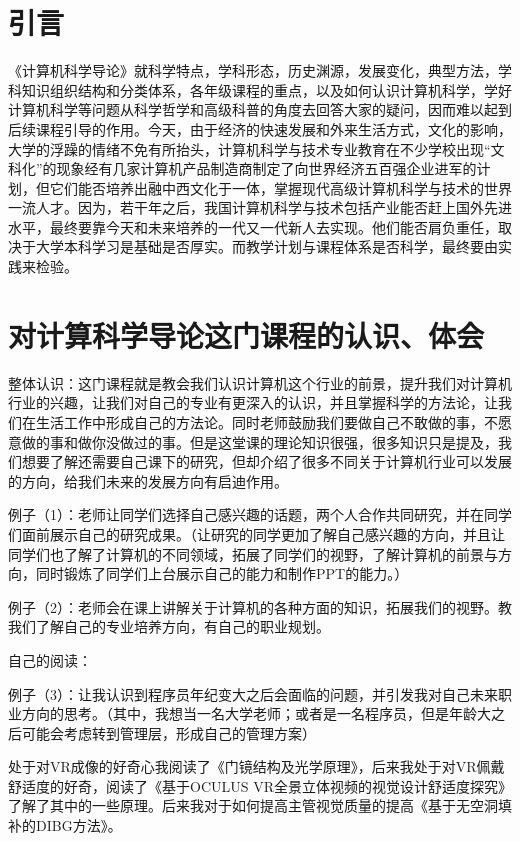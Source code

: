 \documentclass{article}
\begin{document}
\section{引言}
《计算机科学导论》就科学特点，学科形态，历史渊源，发展变化，典型方法，学科知识组织结构和分类体系，各年级课程的重点，以及如何认识计算机科学，学好计算机科学等问题从科学哲学和高级科普的角度去回答大家的疑问，因而难以起到后续课程引导的作用。今天，由于经济的快速发展和外来生活方式，文化的影响，大学的浮躁的情绪不免有所抬头，计算机科学与技术专业教育在不少学校出现“文科化”的现象经有几家计算机产品制造商制定了向世界经济五百强企业进军的计划，但它们能否培养出融中西文化于一体，掌握现代高级计算机科学与技术的世界一流人才。因为，若干年之后，我国计算机科学与技术包括产业能否赶上国外先进水平，最终要靠今天和未来培养的一代又一代新人去实现。他们能否肩负重任，取决于大学本科学习是基础是否厚实。而教学计划与课程体系是否科学，最终要由实践来检验。\par

\section{对计算科学导论这门课程的认识、体会}
 整体认识：这门课程就是教会我们认识计算机这个行业的前景，提升我们对计算机行业的兴趣，让我们对自己的专业有更深入的认识，并且掌握科学的方法论，让我们在生活工作中形成自己的方法论。同时老师鼓励我们要做自己不敢做的事，不愿意做的事和做你没做过的事。但是这堂课的理论知识很强，很多知识只是提及，我们想要了解还需要自己课下的研究，但却介绍了很多不同关于计算机行业可以发展的方向，给我们未来的发展方向有启迪作用。\par
例子（1）：老师让同学们选择自己感兴趣的话题，两个人合作共同研究，并在同学们面前展示自己的研究成果。（让研究的同学更加了解自己感兴趣的方向，并且让同学们也了解了计算机的不同领域，拓展了同学们的视野，了解计算机的前景与方向，同时锻炼了同学们上台展示自己的能力和制作PPT的能力。）\par
例子（2）：老师会在课上讲解关于计算机的各种方面的知识，拓展我们的视野。教我们了解自己的专业培养方向，有自己的职业规划。\par
自己的阅读：\par
例子（3）：让我认识到程序员年纪变大之后会面临的问题，并引发我对自己未来职业方向的思考。（其中，我想当一名大学老师；或者是一名程序员，但是年龄大之后可能会考虑转到管理层，形成自己的管理方案）\par
处于对VR成像的好奇心我阅读了《门镜结构及光学原理》，后来我处于对VR佩戴舒适度的好奇，阅读了《基于OCULUS VR全景立体视频的视觉设计舒适度探究》了解了其中的一些原理。后来我对于如何提高主管视觉质量的提高《基于无空洞填补的DIBG方法》。\par
\end{document}
